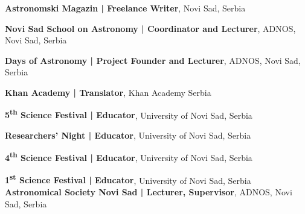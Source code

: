 \begin{scholarship}
					{\textbf{Astronomski Magazin | Freelance Writer}, Novi Sad, Serbia}
					
	                {\textbf{Novi Sad School on Astronomy | Coordinator and Lecturer}, ADNOS, Novi Sad, Serbia}
	                
	                
					{\textbf{Days of Astronomy | Project Founder and Lecturer}, ADNOS, Novi Sad, Serbia}
					

					{\textbf{Khan Academy | Translator}, Khan Academy Serbia}
					
					{\textbf{5\textsuperscript{th} Science Festival | Educator}, University of Novi Sad, Serbia}
					
					{\textbf{Researchers' Night | Educator}, University of Novi Sad, Serbia}	
					
					{\textbf{4\textsuperscript{th} Science Festival | Educator}, University of Novi Sad, Serbia}
					
					{\textbf{1\textsuperscript{st} Science Festival | Educator}, University of Novi Sad, Serbia}	
					{\textbf{Astronomical Society Novi Sad | Lecturer, Supervisor}, ADNOS, Novi Sad, Serbia}					
  \emptySeparator					
\end{scholarship}